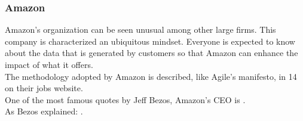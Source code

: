 	\subsubsection{Amazon}
		Amazon's organization can be seen unusual among other large firms.
		This company is characterized an ubiquitous  mindset.
		Everyone is expected to know about the data that is generated by customers so that Amazon can enhance the impact of what it offers.\\		
		The methodology adopted by Amazon is described, like Agile's manifesto, in 14  on their jobs website\cite{amazon_principles}.\\
		One of the most famous quotes by Jeff Bezos, Amazon's CEO is .\\
		As Bezos explained: \cite{how-amazon-became-agile}.

